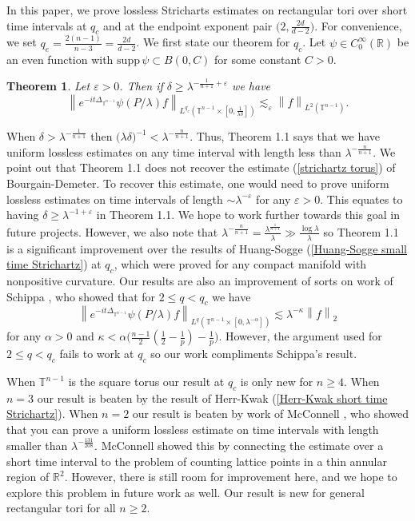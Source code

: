 \documentclass[11pt]{amsart}
\numberwithin{equation}{section}
\newcommand{\Tn}{\mathbb{T}^{n-1}}
\newcommand{\la}{\lambda}
\newcommand\norm[1]{\left\lVert#1\right\rVert}
\newcommand{\lpnorm}[3]{\norm{#1}_{L^{#2}(#3)}}
\newcommand{\altlpnorm}[2]{\norm{#1}_{#2}}
\newcommand{\supp}[1]{\text{supp}\, #1}
\newcommand{\R}[1][]{\mathbb{R}^#1}
\newcommand{\laplac}[1]{\Delta_{#1}}
\newtheorem{theorem}{Theorem}[section]
\begin{document}
In this paper, we prove lossless Stricharts estimates on rectangular tori over short time intervals at $q_c$ and at the endpoint exponent pair $\big(2,\frac{2d}{d-2}\big)$. For convenience, we set  $q_e = \frac{2(n-1)}{n-3} = \frac{2d}{d-2}$. We first state our theorem for $q_c$. Let $\psi \in C_{0}^{\infty}(\mathbb{R})$ be an even function with $\supp \psi \subset B(0,C)$ for some constant $C > 0$. 
\begin{theorem}
    Let $\varepsilon > 0$. Then if $\delta \geq \la^{-\frac{1}{n+1} + \varepsilon}$ we have
    \begin{equation}
        \lpnorm{e^{-it\laplac{\Tn}}\psi(P/\la)f}{q_c}{\Tn \times [0, \frac{1}{\la \delta}]} \lesssim_{\varepsilon} \lpnorm{f}{2}{\Tn}.
    \end{equation}
\end{theorem}
\noindent
When $\delta > \la^{-\frac{1}{n+1}}$ then $\big(\la \delta\big)^{-1} < \la^{-\frac{n}{n+1}}$. Thus, Theorem 1.1 says that we have uniform lossless estimates on any time interval with length less than $\la^{-\frac{n}{n+1}}$. We point out that Theorem 1.1 does not recover the estimate (\ref{strichartz torus}) of Bourgain-Demeter. To recover this estimate, one would need to prove uniform lossless estimates on time intervals of length $\sim \la^{-\varepsilon}$ for any $\varepsilon > 0$. This equates to having $\delta \geq \la^{-1 + \varepsilon}$ in Theorem 1.1. We hope to work further towards this goal in future projects. However, we also note that $\la^{-\frac{n}{n+1}} = \frac{\la^{\frac{1}{n+1}}}{\la} \gg \frac{\log \la}{\la}$ so Theorem 1.1 is a significant improvement over the results of Huang-Sogge (\ref{Huang-Sogge small time Strichartz}) at $q_c$, which were proved for any compact manifold with nonpositive curvature. Our results are also an improvement of sorts on work of Schippa \cite{Schippa2023Strichartz}, who showed that for $2 \leq q < q_c$ we have
\begin{equation}
    \lpnorm{e^{-it\laplac{\Tn}}\psi(P / \la)f}{q}{\Tn \times [0, \la^{-\alpha}]} \lesssim \la^{-\kappa}\altlpnorm{f}{2}
\end{equation}
for any $\alpha > 0$ and $\kappa < \alpha\big(\frac{n-1}{2}(\frac{1}{2} - \frac{1}{p}) - \frac{1}{p}\big)$. However, the argument used for $2 \leq q < q_c$ fails to work at $q_c$ so our work compliments Schippa's result.

When $\Tn$ is the square torus our result at $q_c$ is only new for $n \geq 4$. When $n = 3$ our result is beaten by the result of Herr-Kwak (\ref{Herr-Kwak short time Strichartz}). When $n = 2$ our result is beaten by work of McConnell \cite{McConnell2025ShortTimeStrichartz}, who showed that you can prove a uniform lossless estimate on time intervals with length smaller than $\la^{-\frac{131}{208}}$. McConnell showed this by connecting the estimate over a short time interval to the problem of counting lattice points in a thin annular region of $\R{2}$. However, there is still room for improvement here, and we hope to explore this problem in future work as well.  Our result is new for general rectangular tori for all $n \geq 2$.
\end{document}
